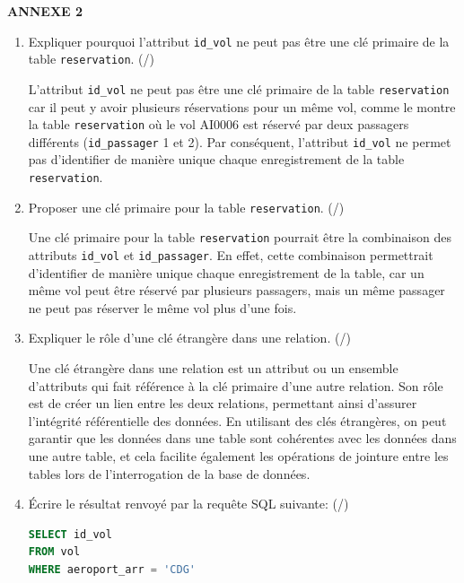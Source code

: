 \medskip
\begin{center}
\textbf{ANNEXE 2}
\end{center}
\medskip



\begin{enumerate}[resume=monDS]
    \item  Expliquer pourquoi l'attribut \texttt{id\_vol} ne peut pas être une clé primaire de la table \texttt{reservation}. (/)
\begin{blocvisiblex}[height=3]
    {\quad}
    L'attribut \texttt{id\_vol} ne peut pas être une clé primaire de la table \texttt{reservation} car il peut y avoir plusieurs réservations pour un même vol, comme le montre la table \texttt{reservation} où le vol AI0006 est réservé par deux passagers différents (\texttt{id\_passager} 1 et 2). Par conséquent, l'attribut \texttt{id\_vol} ne permet pas d'identifier de manière unique chaque enregistrement de la table \texttt{reservation}.
\end{blocvisiblex}

\item Proposer une clé primaire pour la table \texttt{reservation}. (/)
\begin{blocvisiblex}[height=3]
    {\quad}
    Une clé primaire pour la table \texttt{reservation} pourrait être la combinaison des attributs \texttt{id\_vol} et \texttt{id\_passager}. En effet, cette combinaison permettrait d'identifier de manière unique chaque enregistrement de la table, car un même vol peut être réservé par plusieurs passagers, mais un même passager ne peut pas réserver le même vol plus d'une fois.
\end{blocvisiblex}
\item Expliquer le rôle d’une clé étrangère dans une relation. (/)
\begin{blocvisiblex}[height=3]
    {\quad}
    Une clé étrangère dans une relation est un attribut ou un ensemble d'attributs qui fait référence à la clé primaire d'une autre relation. Son rôle est de créer un lien entre les deux relations, permettant ainsi d'assurer l'intégrité référentielle des données. En utilisant des clés étrangères, on peut garantir que les données dans une table sont cohérentes avec les données dans une autre table, et cela facilite également les opérations de jointure entre les tables lors de l'interrogation de la base de données.
\end{blocvisiblex}
\item Écrire le résultat renvoyé par la requête SQL suivante: (/)
\begin{lstlisting}[language=SQL]
SELECT id_vol 
FROM vol 
WHERE aeroport_arr = 'CDG'
\end{lstlisting}


\end{enumerate}
